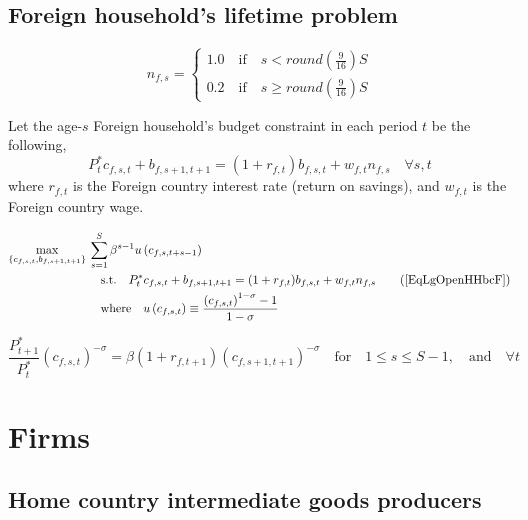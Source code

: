   \subsection{Foreign household's lifetime problem}\label{SecLgOpenHHlifeF}

    \begin{equation}\label{EqLgOpenHHlabF}
      n_{f,s} =
        \begin{cases}
          1.0 \quad\text{if}\quad s < round\left(\frac{9}{16}\right)S \\
          0.2 \quad\text{if}\quad s \geq round\left(\frac{9}{16}\right)S
        \end{cases}
    \end{equation}

    Let the age-$s$ Foreign household's budget constraint in each period $t$ be the following,
    \begin{equation}\label{EqLgOpenHHbcF}
      P^*_t c_{f,s,t} + b_{f,s+1,t+1} = (1 + r_{f,t})b_{f,s,t} + w_{f,t}n_{f,s} \quad\forall s, t
    \end{equation}
    where $r_{f,t}$ is the Foreign country interest rate (return on savings), and $w_{f,t}$ is the Foreign country wage.

    \begin{align}
      \max_{\{c_{f,s,t},b_{f,s+1,t+1}\}}\: &\sum_{s=1}^S \beta^{s-1}u\left(c_{f,s,t+s-1}\right) \label{EqLgOpenHHmaxprobF} \\
      &\quad\text{s.t.}\quad P^*_t c_{f,s,t} + b_{f,s+1,t+1} = (1 + r_{f,t})b_{f,s,t} + w_{f,t}n_{f,s} \tag{\ref{EqLgOpenHHbcF}} \\
      &\quad\text{where}\quad u\left(c_{f,s,t}\right) \equiv \frac{\left(c_{f,s,t}\right)^{1-\sigma} - 1}{1 - \sigma}
    \end{align}

    \begin{equation}\label{EqLgOpenHHeul_bF}
      \frac{P^*_{t+1}}{P^*_t}\left(c_{f,s,t}\right)^{-\sigma} = \beta(1 + r_{f,t+1})\left(c_{f,s+1,t+1}\right)^{-\sigma} \quad\text{for}\quad 1\leq s\leq S-1,\quad\text{and}\quad\forall t
    \end{equation}


\section{Firms}\label{SecLgOpenFirms}


  \subsection{Home country intermediate goods producers}\label{SecLgOpenFirmIntd_H}

